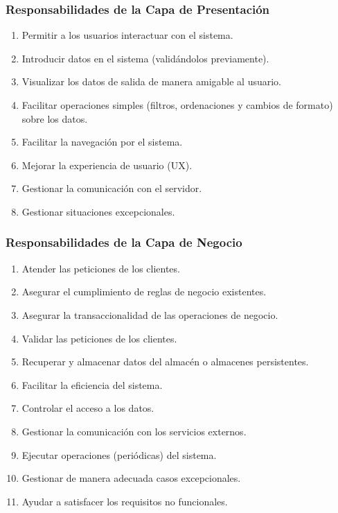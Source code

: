 \documentclass[handout,a4paper,t,xcolor=pst,dvips,colortheme]{beamer}
\begin{document}
\begin{frame}[c]
	\frametitle{Responsabilidades de la Capa de Presentación}
	\begin{enumerate}[<+->]
        \item Permitir a los usuarios interactuar con el sistema.
        \item Introducir datos en el sistema (validándolos previamente).
        \item Visualizar los datos de salida de manera amigable al usuario.
        \item Facilitar operaciones simples (filtros, ordenaciones y cambios de formato) sobre los datos.
        \item Facilitar la navegación por el sistema.
        \item Mejorar la experiencia de usuario (UX). %
        \item Gestionar la comunicación con el servidor.
        \item Gestionar situaciones excepcionales.
	\end{enumerate}
\end{frame}

\begin{frame}[c]
	\frametitle{Responsabilidades de la Capa de Negocio}
	\begin{enumerate}[<+->]
        \item Atender las peticiones de los clientes.
        \item Asegurar el cumplimiento de \alert{reglas de negocio} existentes.
        \item Asegurar la \alert{transaccionalidad} de las operaciones de negocio.
        \item Validar las peticiones de los clientes.
        \item Recuperar y almacenar datos del almacén o almacenes persistentes.
        \item Facilitar la eficiencia del sistema.
        \item Controlar el acceso a los datos.
        \item Gestionar la comunicación con los servicios externos.
        \item Ejecutar operaciones (periódicas) del sistema.
        \item Gestionar de manera adecuada casos excepcionales.
        \item Ayudar a satisfacer los requisitos no funcionales.
	\end{enumerate}
\end{frame}
\end{document}
